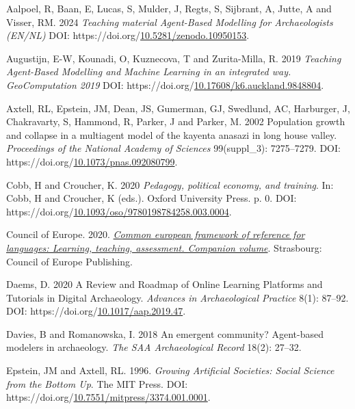 \documentclass[
]{article}
\newlength{\cslhangindent}
\newlength{\cslentryspacingunit} %
\newenvironment{CSLReferences}[2] %
 {%
  \setlength{\parindent}{0pt}
  \ifodd #1
  \let\oldpar\par
  \def\par{\hangindent=\cslhangindent\oldpar}
  \fi
  \setlength{\parskip}{#2\cslentryspacingunit}
 }%
 {}
\begin{document}
\hypertarget{refs}{}
\begin{CSLReferences}{1}{0}
\leavevmode{}%
Aalpoel, R, Baan, E, Lucas, S, Mulder, J, Regts, S, Sijbrant, A, Jutte, A and Visser, RM. 2024 \emph{Teaching material Agent-Based Modelling for Archaeologists (EN/NL)} DOI: https://doi.org/\href{https://doi.org/10.5281/zenodo.10950153}{10.5281/zenodo.10950153}.

\leavevmode{}%
Augustijn, E-W, Kounadi, O, Kuznecova, T and Zurita-Milla, R. 2019 \emph{Teaching Agent-Based Modelling and Machine Learning in an integrated way. GeoComputation 2019} DOI: https://doi.org/\href{https://doi.org/10.17608/k6.auckland.9848804}{10.17608/k6.auckland.9848804}.

\leavevmode{}%
Axtell, RL, Epstein, JM, Dean, JS, Gumerman, GJ, Swedlund, AC, Harburger, J, Chakravarty, S, Hammond, R, Parker, J and Parker, M. 2002 Population growth and collapse in a multiagent model of the kayenta anasazi in long house valley. \emph{Proceedings of the National Academy of Sciences} 99(suppl{\_}3): 7275--7279. DOI: https://doi.org/\href{https://doi.org/10.1073/pnas.092080799}{10.1073/pnas.092080799}.

\leavevmode{}%
Cobb, H and Croucher, K. 2020 \emph{Pedagogy, political economy, and training}. In: Cobb, H and Croucher, K (eds.). Oxford University Press. p. 0. DOI: https://doi.org/\href{https://doi.org/10.1093/oso/9780198784258.003.0004}{10.1093/oso/9780198784258.003.0004}.

\leavevmode{}%
Council of Europe. 2020. \emph{\href{http://www.coe.int/lang-cefr}{Common european framework of reference for languages: Learning, teaching, assessment. Companion volume}}. Strasbourg: Council of Europe Publishing.

\leavevmode{}%
Daems, D. 2020 A Review and Roadmap of Online Learning Platforms and Tutorials in Digital Archaeology. \emph{Advances in Archaeological Practice} 8(1): 87--92. DOI: https://doi.org/\href{https://doi.org/10.1017/aap.2019.47}{10.1017/aap.2019.47}.

\leavevmode{}%
Davies, B and Romanowska, I. 2018 An emergent community? Agent-based modelers in archaeology. \emph{The SAA Archaeological Record} 18(2): 27--32.

\leavevmode{}%
Epstein, JM and Axtell, RL. 1996. \emph{Growing Artificial Societies: Social Science from the Bottom Up}. The MIT Press. DOI: https://doi.org/\href{https://doi.org/10.7551/mitpress/3374.001.0001}{10.7551/mitpress/3374.001.0001}.


\end{CSLReferences}
\end{document}
